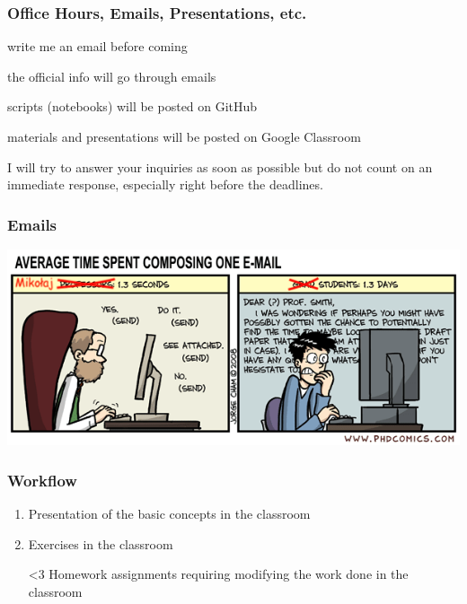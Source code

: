 \documentclass{beamer}
\begin{document}
\begin{frame}
    \frametitle{Office Hours, Emails, Presentations, etc.}
    \begin{description}
        \item [Office Hours:] write me an email before coming
        \item [Emails:] the official info will go through emails
        \item [GitHub:] scripts (notebooks) will be posted on GitHub
        \item [Google Classroom:] materials and presentations will be posted on
        Google Classroom
    \end{description}
    \alert{I will try to answer your inquiries as soon as possible but do not
    count on an immediate response, especially right before the deadlines.}
\end{frame}
\begin{frame}
    \frametitle{Emails}
        \includegraphics[width = \textwidth]{emails.png}
\end{frame}
\begin{frame}
    \frametitle{Workflow}
    \begin{enumerate}
        \item Presentation of the basic concepts in the classroom
        \item Exercises in the classroom
        \item [<3] Homework assignments requiring modifying the work done in the classroom
    \end{enumerate}
\end{frame}
\end{document}
